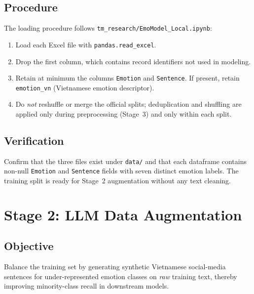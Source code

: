 \documentclass[11pt,a4paper]{article}
\newcommand{\repo}[1]{\texttt{#1}}
\begin{document}
\subsection{Procedure}
The loading procedure follows \repo{tm\_research/EmoModel\_Local.ipynb}:
\begin{enumerate}[label=\arabic*.]
  \item Load each Excel file with \texttt{pandas.read\_excel}.
  \item Drop the first column, which contains record identifiers not used in modeling.
  \item Retain at minimum the columns \texttt{Emotion} and \texttt{Sentence}. If present, retain \texttt{emotion\_vn} (Vietnamese emotion descriptor).
  \item Do \emph{not} reshuffle or merge the official splits; deduplication and shuffling are applied only during preprocessing (Stage~3) and only within each split.
\end{enumerate}

\subsection{Verification}
Confirm that the three files exist under \repo{data/} and that each dataframe contains non-null \texttt{Emotion} and \texttt{Sentence} fields with seven distinct emotion labels. The training split is ready for Stage~2 augmentation without any text cleaning.

\section{Stage 2: LLM Data Augmentation}
\label{sec:augmentation}

\subsection{Objective}
Balance the training set by generating synthetic Vietnamese social-media sentences for under-represented emotion classes on \emph{raw} training text, thereby improving minority-class recall in downstream models.
\end{document}
